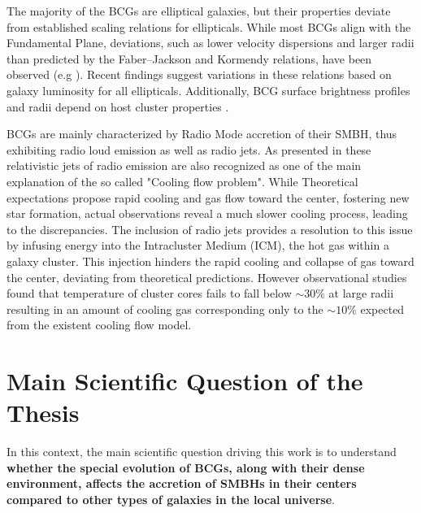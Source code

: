 The majority of the BCGs are elliptical galaxies, but their properties deviate from established scaling relations for ellipticals. While most BCGs align with the Fundamental Plane, deviations, such as lower velocity dispersions and larger radii than predicted by the Faber–Jackson and Kormendy relations, have been observed (e.g \cite{1991ApJ...375...15O}). Recent findings suggest variations in these relations based on galaxy luminosity for all ellipticals. Additionally, BCG surface brightness profiles and radii depend on host cluster properties \cite{2005MNRAS.364.1354B}. 

 
BCGs are mainly characterized by Radio Mode accretion of their SMBH, thus exhibiting radio loud emission as well as radio jets. As presented in \cite{2007MNRAS.379..867V} these relativistic jets of radio emission are also recognized as one of the main explanation of the so called "Cooling flow problem". 
While Theoretical expectations propose rapid cooling and gas flow toward the center, fostering new star formation, actual observations reveal a much slower cooling process, leading to the discrepancies.
The inclusion of radio jets provides a resolution to this issue by infusing energy into the Intracluster Medium (ICM), the hot gas within a galaxy cluster. This injection hinders the rapid cooling and collapse of gas toward the center, deviating from theoretical predictions. However observational studies found that temperature of cluster cores fails to fall below $\sim 30\%$ at large radii resulting in an amount of cooling gas corresponding only to the $\sim 10\%$ expected from the existent cooling flow model. \cite{David_2001} %

\newpage
\section{ Main Scientific Question of the Thesis} %
In this context, the main scientific question driving this work is to understand \textbf{whether the special evolution of BCGs, along with their dense environment, affects the accretion of SMBHs in their centers compared to other types of galaxies in the local universe}.

